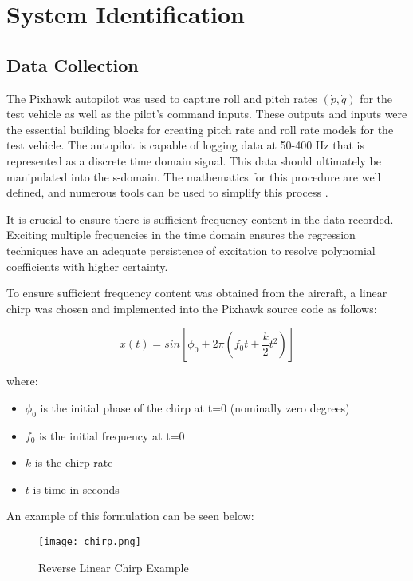 \label{appendix:system_identification}
\section{System Identification}

\subsection{Data Collection}
The Pixhawk autopilot was used to capture roll and pitch rates $(\dot{p},\dot{q})$ for the test vehicle as well as the pilot's command inputs.  These outputs and inputs were the essential building blocks for creating pitch rate and roll rate models for the test vehicle.  The autopilot is capable of logging data at 50-400 Hz that is represented as a discrete time domain signal.  This data should ultimately be manipulated into the s-domain.  The mathematics for this procedure are well defined, and numerous tools can be used to simplify this process \cite{tfest_matlab}.  

It is crucial to ensure there is sufficient frequency content in the data recorded.  Exciting multiple frequencies in the time domain ensures the regression techniques have an adequate persistence of excitation to resolve polynomial coefficients with higher certainty.  

To ensure sufficient frequency content was obtained from the aircraft, a linear chirp was chosen and implemented into the Pixhawk source code as follows:

\begin{equation}
x(t)=sin\left[\phi_0+2\pi\left(f_0t+\frac{k}{2}t^2\right)\right]
\end{equation}

where:
\begin{itemize}
 \item[] $\phi_0$ is the initial phase of the chirp at t=0 (nominally zero degrees)
 \item[] $f_0$ is the initial frequency at t=0
 \item[] $k$ is the chirp rate
 \item[] $t$  is time in seconds
\end{itemize}

An example of this formulation can be seen below:

\begin{figure}[!h]
 \centering
  \texttt{[image: chirp.png]}
  \caption{Reverse Linear Chirp Example}
  \label{fig:chirp}
\end{figure}

